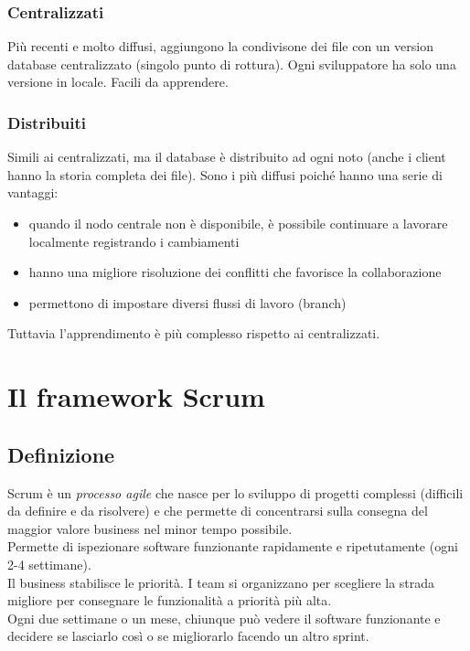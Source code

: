 \documentclass[10pt, a4paper]{article}
\begin{document}
\subsubsection*{Centralizzati}
Più recenti e molto diffusi, aggiungono la condivisone dei file con un version database centralizzato (singolo punto di rottura). Ogni sviluppatore ha solo una versione in locale. Facili da apprendere.

\subsubsection*{Distribuiti}
Simili ai centralizzati, ma il database è distribuito ad ogni noto (anche i client hanno la storia completa dei file). Sono i più diffusi poiché hanno una serie di vantaggi:
\begin{itemize}
\item quando il nodo centrale non è disponibile, è possibile continuare a lavorare localmente registrando i cambiamenti
\item hanno una migliore risoluzione dei conflitti che favorisce la collaborazione
\item permettono di impostare diversi flussi di lavoro (branch)
\end{itemize}
Tuttavia l'apprendimento è più complesso rispetto ai centralizzati.

\section{Il framework Scrum}
\subsection{Definizione}
Scrum è un \textit{processo agile} che nasce per lo sviluppo di progetti complessi (difficili da definire e da risolvere) e che permette di concentrarsi sulla consegna del maggior valore business nel minor tempo possibile.\\
Permette di ispezionare software funzionante rapidamente e ripetutamente (ogni 2-4 settimane).\\
Il business stabilisce le priorità. I team si organizzano per scegliere la strada migliore per consegnare le funzionalità a priorità più alta.\\
Ogni due settimane o un mese, chiunque può vedere il software funzionante e decidere se lasciarlo così o se migliorarlo facendo un altro sprint.
\end{document}
